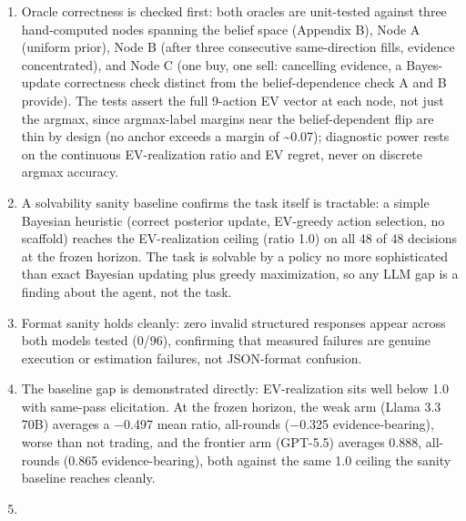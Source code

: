 \documentclass[
  11pt,
]{article}
\providecommand{\tightlist}{%
  \setlength{\itemsep}{0pt}\setlength{\parskip}{0pt}}
\begin{document}
\begin{enumerate}
\def\labelenumi{\arabic{enumi}.}
\tightlist
\item
  Oracle correctness is checked first: both oracles are unit-tested against three hand-computed nodes spanning the belief space (Appendix B), Node A (uniform prior), Node B (after three consecutive same-direction fills, evidence concentrated), and Node C (one buy, one sell: cancelling evidence, a Bayes-update correctness check distinct from the belief-dependence check A and B provide). The tests assert the full 9-action EV vector at each node, not just the argmax, since argmax-label margins near the belief-dependent flip are thin by design (no anchor exceeds a margin of \textasciitilde0.07); diagnostic power rests on the continuous EV-realization ratio and EV regret, never on discrete argmax accuracy.
\item
  A solvability sanity baseline confirms the task itself is tractable: a simple Bayesian heuristic (correct posterior update, EV-greedy action selection, no scaffold) reaches the EV-realization ceiling (ratio 1.0) on all 48 of 48 decisions at the frozen horizon. The task is solvable by a policy no more sophisticated than exact Bayesian updating plus greedy maximization, so any LLM gap is a finding about the agent, not the task.
\item
  Format sanity holds cleanly: zero invalid structured responses appear across both models tested (0/96), confirming that measured failures are genuine execution or estimation failures, not JSON-format confusion.
\item
  The baseline gap is demonstrated directly: EV-realization sits well below 1.0 with same-pass elicitation. At the frozen horizon, the weak arm (Llama 3.3 70B) averages a −0.497 mean ratio, all-rounds (−0.325 evidence-bearing), worse than not trading, and the frontier arm (GPT-5.5) averages 0.888, all-rounds (0.865 evidence-bearing), both against the same 1.0 ceiling the sanity baseline reaches cleanly.
\item

\end{enumerate}
\end{document}
